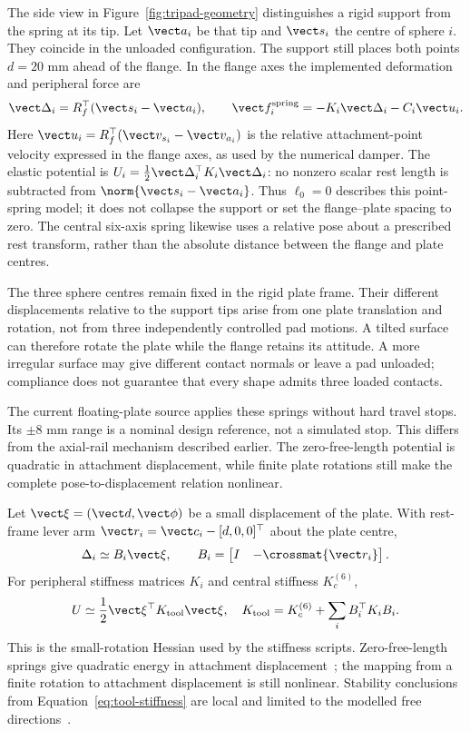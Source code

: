 The side view in Figure~\ref{fig:tripad-geometry} distinguishes a rigid support from the spring at its tip. Let $\vect a_i$ be that tip and $\vect s_i$ the centre of sphere $i$. They coincide in the unloaded configuration. The support still places both points $d=20$ mm ahead of the flange. In the flange axes the implemented deformation and peripheral force are
\begin{equation}
\vect\Delta_i=R_f^\top(\vect s_i-\vect a_i),\qquad
\vect f_i^{\mathrm{spring}}=-K_i\vect\Delta_i-C_i\vect u_i.
\label{eq:plate-point-spring}
\end{equation}
Here $\vect u_i=R_f^\top(\vect v_{s_i}-\vect v_{a_i})$ is the relative attachment-point velocity expressed in the flange axes, as used by the numerical damper. The elastic potential is $U_i=\tfrac12\vect\Delta_i^\top K_i\vect\Delta_i$: no nonzero scalar rest length is subtracted from $\norm{\vect s_i-\vect a_i}$. Thus $\ell_0=0$ describes this point-spring model; it does not collapse the support or set the flange--plate spacing to zero. The central six-axis spring likewise uses a relative pose about a prescribed rest transform, rather than the absolute distance between the flange and plate centres.

The three sphere centres remain fixed in the rigid plate frame. Their different displacements relative to the support tips arise from one plate translation and rotation, not from three independently controlled pad motions. A tilted surface can therefore rotate the plate while the flange retains its attitude. A more irregular surface may give different contact normals or leave a pad unloaded; compliance does not guarantee that every shape admits three loaded contacts.

The current floating-plate source applies these springs without hard travel stops. Its $\pm8$ mm range is a nominal design reference, not a simulated stop. This differs from the axial-rail mechanism described earlier. The zero-free-length potential is quadratic in attachment displacement, while finite plate rotations still make the complete pose-to-displacement relation nonlinear.


Let $\vect\xi=(\vect d,\vect\phi)$ be a small displacement of the plate. With rest-frame lever arm $\vect r_i=\vect c_i-[d,0,0]^\top$ about the plate centre,
\begin{equation}
\Delta_i\simeq B_i\vect\xi,\qquad
B_i=\begin{bmatrix}I&-\crossmat{\vect r_i}\end{bmatrix}.
\end{equation}
For peripheral stiffness matrices $K_i$ and central stiffness $K_c^{(6)}$,
\begin{equation}
U\simeq\frac12\vect\xi^\top K_{\mathrm{tool}}\vect\xi,
\quad
K_{\mathrm{tool}}=K_c^{(6)}+\sum_i B_i^\top K_iB_i.
\label{eq:tool-stiffness}
\end{equation}
This is the small-rotation Hessian used by the stiffness scripts. Zero-free-length springs give quadratic energy in attachment displacement~\cite{herder2001}; the mapping from a finite rotation to attachment displacement is still nonlinear. Stability conclusions from Equation~\eqref{eq:tool-stiffness} are local and limited to the modelled free directions~\cite{guest2006}.


